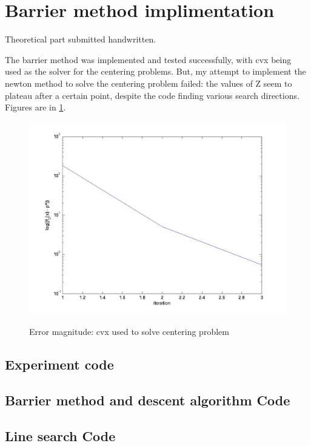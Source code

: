 \documentclass{article}
\begin{document}
\section{Barrier method implimentation}
Theoretical part submitted handwritten.

The barrier method was implemented and tested successfully, with cvx being used as the solver for the centering problems. But, my attempt to implement the newton method to solve the centering problem failed: the values of Z seem to plateau after a certain point, despite the code finding various search directions. Figures are in \ref{fig:results4}.

\begin{figure}[h!]
\includegraphics[scale=0.2]{log/etp/@(wt,Z_init)centeringSolver_cvx(Sigma,wt,Z_init)2010-05-13-13:42:20:986.jpg}
\label{fig:results4}
\caption{Error magnitude: cvx used to solve centering problem}
\end{figure}

\subsection{Experiment code}


\subsection{Barrier method and descent algorithm Code}



\subsection{Line search Code}



% 
% 
\end{document}
